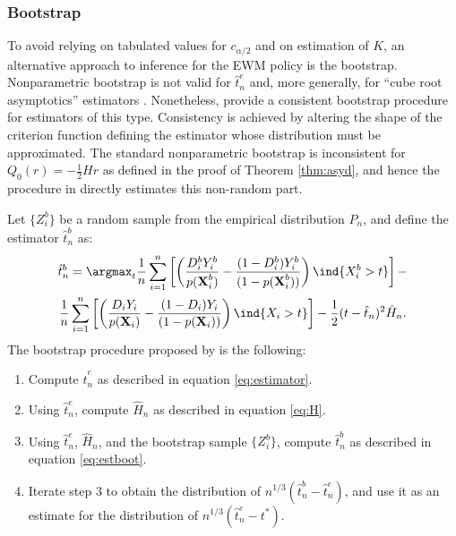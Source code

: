 {\subsubsection{Bootstrap}
To avoid relying on tabulated values for $c_{\alpha/2}$ and on estimation of $K$, an alternative approach to inference for the EWM policy is the bootstrap. Nonparametric bootstrap is not valid for $\hat{t}^e_n$ and, more generally, for ``cube root asymptotics'' estimators \citep{abrevaya2005bootstrap,leger2006bootstrap}. Nonetheless, \cite{cattaneo2020bootstrap} provide a consistent bootstrap procedure for estimators of this type. Consistency is achieved by altering the shape of the criterion function defining the estimator whose distribution must be approximated. The standard nonparametric bootstrap is inconsistent for $Q_0(r) = -\frac{1}{2}Hr$ as defined in the proof of Theorem \ref{thm:asyd}, and hence the procedure in \cite{cattaneo2020bootstrap} directly estimates this non-random part.

Let $\{Z_i^b\}$ be a random sample from the empirical distribution $P_n$, and define the estimator $\hat{t}^b_n$ as:
\begin{gather} \label{eq:estboot}
    \hat{t}^b_n=\argmax_{t} \frac{1}{n} \sum_{i=1}^n \left[\left(\frac{D_i^b Y_i^b}{p(\textbf{X}_i^b)} - \frac{(1-D_i^b) Y_i^b}{(1-p(\textbf{X}_i^b))} \right) \ind\{X_i^b > t\}\right] - \\
        \frac{1}{n} \sum_{i=1}^n \left[\left(\frac{D_i Y_i}{p(\textbf{X}_i)} - \frac{(1-D_i) Y_i}{(1-p(\textbf{X}_i))} \right) \ind\{X_i > t\}\right] - \frac{1}{2} (t - \hat{t}_n)^2 \hat{H}_n.
\end{gather}
The bootstrap procedure proposed by \cite{cattaneo2020bootstrap} is the following:
\begin{enumerate}
    \item Compute $\hat{t}^e_n$ as described in equation \eqref{eq:estimator}.
    \item Using $\hat{t}^e_n$, compute $\hat{H}_n$ as described in equation \eqref{eq:H}.
    \item Using $\hat{t}^e_n$, $\hat{H}_n$, and the bootstrap sample $\{Z_i^b\}$, compute $\hat{t}^b_n$ as described in equation \eqref{eq:estboot}.
    \item Iterate step 3 to obtain the distribution of $n^{1/3} \left(\hat{t}^b_n - \hat{t}^e_n\right)$, and use it as an estimate for the distribution of $n^{1/3} \left(\hat{t}^e_n - t^* \right)$.
\end{enumerate}

}
